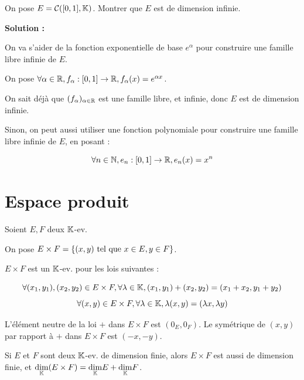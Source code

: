 \documentclass[12pt, a4paper]{report}
\begin{document}
\begin{exercise}
    On pose $E = \mathcal{C}([0,1],\mathbb{K})$. Montrer que $E$ est de dimension infinie.

    \textbf{Solution :}

    On va s'aider de la fonction exponentielle de base $e^\alpha$ pour construire une famille libre infinie de $E$.

    On pose $\forall \alpha \in \mathbb{R}, f_\alpha : [0,1] \to \mathbb{R}, f_\alpha(x) = e^{\alpha x}$.

    On sait déjà que $(f_\alpha)_{\alpha \in \mathbb{R}}$ est une famille libre, et infinie, donc $E$ est de dimension infinie.

    Sinon, on peut aussi utiliser une fonction polynomiale pour construire une famille libre infinie de $E$, en posant :

    $$\forall n \in \mathbb{N}, e_n : [0,1] \to \mathbb{R}, e_n(x) = x^n$$
\end{exercise}

\section{Espace produit}

\begin{definition}
    Soient $E,F$ deux $\mathbb{K}$-ev.

    On pose $E\times F = \{(x,y) \text{ tel que } x \in E, y \in F\}$.

    $E \times F$ est un $\mathbb{K}$-ev. pour les lois suivantes :
    
    $$\forall (x_1,y_1),(x_2,y_2) \in E\times F, \forall \lambda \in \mathbb{K}, (x_1,y_1) + (x_2,y_2) = (x_1+x_2,y_1+y_2)$$
    $$\forall (x,y) \in E\times F, \forall \lambda \in \mathbb{K}, \lambda (x,y) = (\lambda x, \lambda y)$$
\end{definition}

\begin{remark}
    \begin{outline}
        \1 L'élément neutre de la loi $+$ dans $E\times F$ est $(0_E,0_F)$.
        \1 Le symétrique de $(x,y)$ par rapport à $+$ dans $E\times F$ est $(-x,-y)$.
    \end{outline}
\end{remark}

\begin{property}
    Si $E$ et $F$ sont deux $\mathbb{K}$-ev. de dimension finie, alors $E\times F$ est aussi de dimension finie, et $\underset{\mathbb{K}}\dim (E\times F) = \underset{\mathbb{K}}\dim E + \underset{\mathbb{K}}\dim F$.
\end{property}
\end{document}

